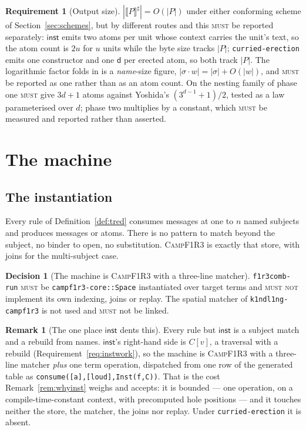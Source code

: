 \documentclass[11pt,a4paper]{article}
\newcommand{\code}[1]{\texttt{#1}}
\newcommand{\Camp}{\textsc{CampF1R3}}
\newcommand{\MUST}{\textsc{must}}
\newcommand{\MUSTNOT}{\textsc{must not}}
\newcommand{\enc}[1]{\llbracket #1 \rrbracket}
\newcommand{\dd}{\mathsf{d}}
\newcommand{\inst}{\mathsf{inst}}
\theoremstyle{definition}
\newtheorem{requirement}[definition]{Requirement}
\newtheorem{decision}[definition]{Decision}
\newtheorem{remark}[definition]{Remark}
\theoremstyle{plain}
\begin{document}
\begin{requirement}[Output size]\label{req:size}
$|\enc{P}^{\sharp}| = O(|P|)$ under either conforming scheme of
Section~\ref{sec:schemes}, but by different routes and this \MUST{} be
reported separately: $\inst$ emits two atoms per unit whose context carries
the unit's text, so the atom count is $2u$ for $u$ units while the byte size
tracks $|P|$; \code{curried-erection} emits one constructor and one $\dd$ per
erected atom, so both track $|P|$. The logarithmic factor \cite[Prop.~8.1]{draft3} folds in is a
\emph{name}-size figure, $|\sigma\!\cdot\!w| = |\sigma| + O(|w|)$, and \MUST{}
be reported as one rather than as an atom count. On the nesting family of
\cite[Prop.~8.2]{draft3} phase one \MUST{} give $3d+1$ atoms against Yoshida's
$(3^{d-1}+1)/2$, tested as a law parameterised over $d$; phase two multiplies
by a constant, which \MUST{} be measured and reported rather than asserted.
\end{requirement}

\section{The machine}\label{sec:runtime}

\subsection{The instantiation}

Every rule of Definition~\ref{def:tred} consumes messages at one to $n$ named
subjects and produces messages or atoms. There is no pattern to match beyond
the subject, no binder to open, no substitution. \Camp{} is exactly that
store, with joins for the multi-subject case.

\begin{decision}[The machine is \Camp{} with a three-line matcher]
\label{dec:machine}
\code{f1r3comb-run} \MUST{} be \code{campf1r3-core::Space} instantiated over
target terms and \MUSTNOT{} implement its own indexing, joins or replay. The
spatial matcher of \code{k1ndl1ng-campf1r3} is not used and \MUST{} not be
linked.
\end{decision}

\begin{remark}[The one place $\inst$ dents this]\label{rem:machinedent}
Every rule but $\inst$ is a subject match and a rebuild from names. $\inst$'s
right-hand side is $C[v]$, a traversal with a rebuild
(Requirement~\ref{req:instwork}), so the machine is \Camp{} with a three-line
matcher \emph{plus} one term operation, dispatched from one row of the
generated table as \code{consume([a],[loud],Inst(f,C))}. That is the cost
Remark~\ref{rem:whyinst} weighs and accepts: it is bounded --- one operation,
on a compile-time-constant context, with precomputed hole positions --- and it
touches neither the store, the matcher, the joins nor replay. Under
\code{curried-erection} it is absent.
\end{remark}
\end{document}
